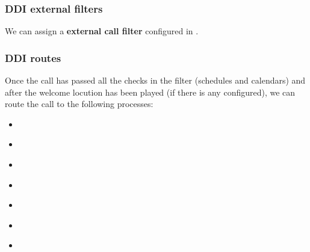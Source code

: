 \documentclass[letterpaper,10pt,spanish]{sphinxmanual}
\begin{document}
\subsubsection{DDI external filters}
\label{administration_portal/client/vpbx/ddis:ddi-external-filters}
We can assign a \textbf{external call filter} configured in {\hyperref[administration_portal/client/vpbx/routing_tools/external_call_filters:external\string-call\string-filters]{}}.


\subsubsection{DDI routes}
\label{administration_portal/client/vpbx/ddis:routing-logics}\label{administration_portal/client/vpbx/ddis:ddi-routes}
Once the call has passed all the checks in the filter (schedules and calendars)
and after the welcome locution has been played (if there is any configured),
we can route the call to the following processes:
\begin{itemize}
\item {} 
{\hyperref[administration_portal/client/vpbx/users:users]{}}

\item {} 
{\hyperref[administration_portal/client/vpbx/routing_endpoints/hunt_groups:huntgroups]{}}

\item {} 
{\hyperref[administration_portal/client/vpbx/routing_endpoints/ivrs:ivrs]{}}

\item {} 
{\hyperref[administration_portal/client/vpbx/routing_endpoints/conference_rooms:conference\string-rooms]{}}

\item {} 
{\hyperref[administration_portal/client/vpbx/routing_endpoints/conditional_routes:conditional\string-routes]{}}

\item {} 
{\hyperref[administration_portal/client/vpbx/routing_endpoints/queues:queues]{}}

\item {} 
{\hyperref[administration_portal/client/vpbx/routing_endpoints/friends/index:friends]{}}

\end{itemize}
\end{document}
